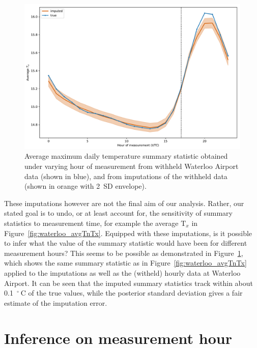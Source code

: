 \documentclass[letter]{article}
\makeatletter
\def\maxwidth{\ifdim\Gin@nat@width>\linewidth\linewidth
\else\Gin@nat@width\fi}
\let\Oldincludegraphics\includegraphics
\renewcommand{\includegraphics}[1]{\Oldincludegraphics[width=0.98\maxwidth]{#1}}
\newcommand{\T}{\mathrm{T}}
\newcommand{\Tx}{\T_{x}}
\newcommand{\degreeC}{{}^{\circ}~\mathrm{C}}
\makeatother
\begin{document}
        \begin{figure}
\centering
\includegraphics{../figures/imputed_summary_stats.pdf}
\caption{\label{fig:imputed_summary_stats}Average maximum daily temperature summary statistic obtained under varying hour of measurement from withheld Waterloo Airport data (shown in blue), and from imputations of the withheld data (shown in orange with 2~SD envelope).}
\end{figure}
    


        These imputations however are not the final aim of our analysis.
Rather, our stated goal is to undo, or at least account for, the sensitivity of summary statistics to measurement time, for example the average \(\Tx\) in Figure~\ref{fig:waterloo_avgTnTx}.
Equipped with these imputations, is it possible to infer what the value of the summary statistic would have been for different measurement hours?
This seems to be possible as demonstrated in Figure~\ref{fig:imputed_summary_stats},
which shows the same summary statistic as in Figure~\ref{fig:waterloo_avgTnTx} applied to the imputations as well as the (witheld) hourly data at Waterloo Airport.
It can be seen that the imputed summary statistics track within about 0.1~\(\degreeC\) of the true values,
while the posterior standard deviation gives a fair estimate of the imputation error.
    


        \section{Inference on measurement hour}\label{inference-on-measurement-hour}
\end{document}
